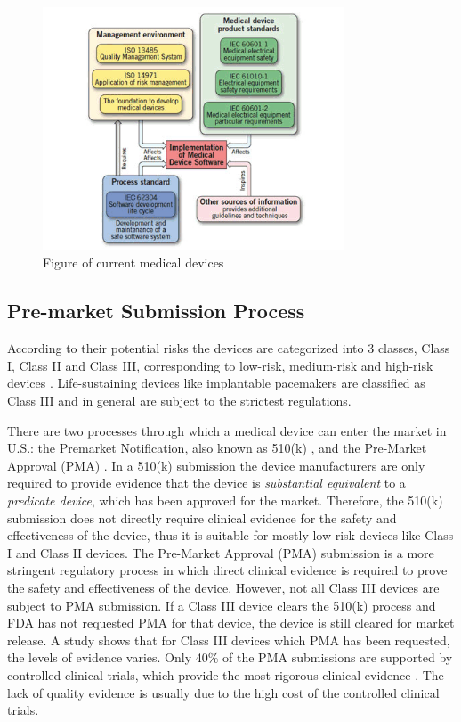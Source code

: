 \begin{figure}[t]
		\centering
		\includegraphics[width=0.8\textwidth]{figs/standards.jpg}
		\caption{\small Figure of current medical devices}
		\label{fig:Cur}
\end{figure}
\subsection{Pre-market Submission Process}
According to their potential risks the devices are categorized into 3 classes, Class I, Class II and Class III, corresponding to low-risk, medium-risk and high-risk devices \cite{class}. Life-sustaining devices like implantable pacemakers are classified as Class III and in general are subject to the strictest regulations.

There are two processes through which a medical device can enter the market in U.S.: the Premarket Notification, also known as 510(k) \cite{510k}, and the Pre-Market Approval (PMA) \cite{PMA}. In a 510(k) submission the device manufacturers are only required to provide evidence that the device is \emph{substantial equivalent} to a \emph{predicate device}, which has been approved for the market. Therefore, the 510(k) submission does not directly require clinical evidence for the safety and effectiveness of the device, thus it is suitable for mostly low-risk devices like Class I and Class II devices.  The Pre-Market Approval (PMA) submission is a more stringent regulatory process in which direct clinical evidence is required to prove the safety and effectiveness of the device. However, not all Class III devices are subject to PMA submission. If a Class III device clears the 510(k) process and FDA has not requested PMA for that device, the device is still cleared for market release. A study shows that for Class III devices which PMA has been requested, the levels of evidence varies. Only 40\% of the PMA submissions are supported by controlled clinical trials, which provide the most rigorous clinical evidence \cite{cert_prob}. The lack of quality evidence is usually due to the high cost of the controlled clinical trials.

